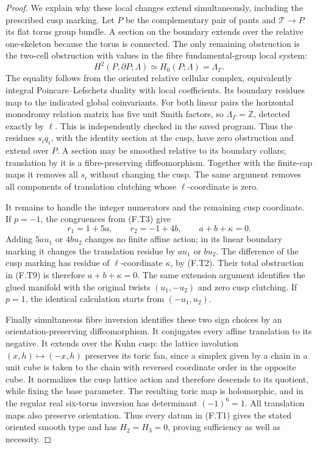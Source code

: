 \begin{proof}
We explain why these local changes extend simultaneously,
including the prescribed cusp marking.
Let $P$ be the complementary pair of pants and
$\mathcal T\to P$ its flat torus group bundle.
A section on the boundary extends over the relative
one-skeleton because the torus is connected.
The only remaining obstruction is the two-cell obstruction
with values in the fibre fundamental-group local system:
\[
 H^2(P,\partial P;\Lambda)
        \simeq H_0(P;\Lambda)=\Lambda_\Gamma.
 \tag{F.T9}
\]
The equality follows from the oriented relative cellular
complex, equivalently integral Poincare--Lefschetz duality
with local coefficients.  Its boundary residues map to
the indicated global coinvariants.
For both linear pairs the horizontal monodromy relation
matrix has five unit Smith factors, so
$\Lambda_\Gamma=\mathbb Z$, detected exactly by $\ell$.
This is independently checked in the saved program.
Thus the residues $s_iq_i$, with the identity section at the
cusp, have zero obstruction and extend over $P$.
A section may be smoothed relative to its boundary collars;
translation by it is a fibre-preserving diffeomorphism.
Together with the finite-cap maps it removes all $s_i$
without changing the cusp.
The same argument removes all components of translation
clutching whose $\ell$-coordinate is zero.

It remains to handle the integer numerators and the remaining
cusp coordinate.  If $p=-1$, the congruences from (F.T3)
give
\[
 r_1=1+5a,\qquad r_2=-1+4b,
 \qquad a+b+\kappa=0.
 \tag{F.T10}
\]
Adding $5a u_1$ or $4b u_2$ changes no finite affine action;
in its linear boundary marking it changes the translation
residue by $a u_1$ or $b u_2$.
The difference of the cusp marking has residue of
$\ell$-coordinate $\kappa$, by (F.T2).
Their total obstruction in (F.T9) is therefore
$a+b+\kappa=0$.
The same extension argument identifies the glued manifold
with the original twists $(u_1,-u_2)$ and zero cusp
clutching.
If $p=1$, the identical calculation starts from
$(-u_1,u_2)$.

Finally simultaneous fibre inversion identifies these two
sign choices by an orientation-preserving diffeomorphism.
It conjugates every affine translation to its negative.
It extends over the Kuhn cusp: the lattice involution
$(x,h)\mapsto(-x,h)$ preserves its toric fan, since a
simplex given by a chain in a unit cube is taken to the
chain with reversed coordinate order in the opposite cube.
It normalizes the cusp lattice action and therefore descends
to its quotient, while fixing the base parameter.  The resulting toric map is holomorphic,
and in the regular real six-torus inversion has determinant
$(-1)^6=1$.  All translation maps also preserve orientation.
Thus every datum in (F.T1) gives the stated oriented smooth
type and has $H_2=H_3=0$, proving sufficiency as well as
necessity.
\end{proof}
